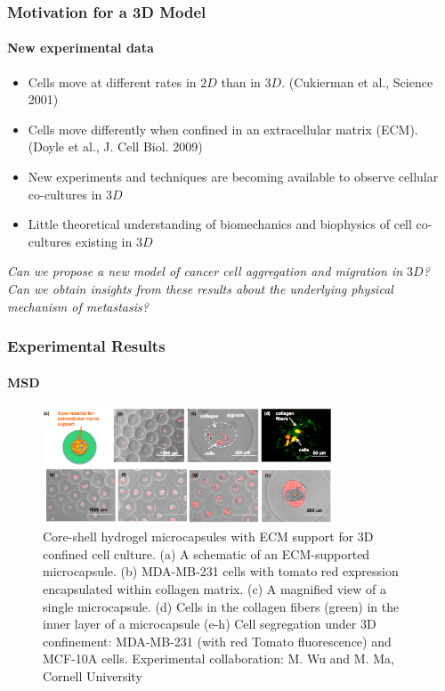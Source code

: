 \documentclass{beamer}
\begin{document}
  \begin{frame}
    \frametitle{Motivation for a 3D Model}
    \framesubtitle{New experimental data}
    
    \begin{itemize}
    \item Cells move at different rates in $2D$ than in $3D$.
    (Cukierman et al., Science 2001)
    \item Cells move differently when confined in an extracellular matrix (ECM). 
    (Doyle et al., J. Cell Biol. 2009)       
    \item New experiments and techniques are becoming available to observe cellular co-cultures in $3D$
    
    \item Little theoretical understanding of biomechanics and biophysics of cell co-cultures existing in $3D$
    \end{itemize}
    
    
	\center\emph{Can we propose a new model of cancer cell aggregation and migration in $3D$? \\
	Can we obtain insights from these results about the underlying physical mechanism of metastasis?}
    
    \vfill
    
  \end{frame}
    
  \begin{frame}
    \frametitle{Experimental Results}
    \framesubtitle{MSD}
    \begin{figure}
    \includegraphics[width=3.4in]{MMaMWufig.png}
    \caption{Core-shell hydrogel microcapsules with ECM support for 3D confined cell culture. (a) A schematic of an ECM-supported microcapsule. (b) MDA-MB-231 cells with tomato red expression encapsulated within collagen matrix. (c) A magnified view of a single microcapsule. (d) Cells in the collagen fibers (green) in the inner layer of a microcapsule (e-h) Cell segregation under 3D confinement: MDA-MB-231 (with red Tomato fluorescence) and MCF-10A cells.
Experimental collaboration: M. Wu and M. Ma, Cornell University}
    \end{figure}
    \vfill
  \end{frame}
    
\end{document}
